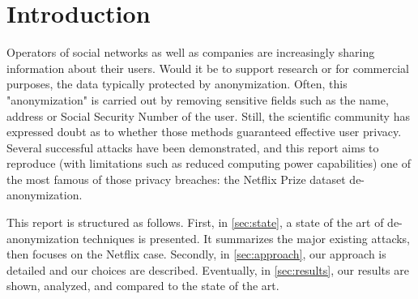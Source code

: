 \section{Introduction}

Operators of social networks as well as companies are increasingly sharing information about their users. Would it be to support research or for commercial purposes, the data typically protected by anonymization. Often, this "anonymization" is carried out by removing sensitive fields such as the name, address or Social Security Number of the user. Still, the scientific community has expressed doubt as to whether those methods guaranteed effective user privacy. Several successful attacks have been demonstrated, and this report aims to reproduce (with limitations such as reduced computing power capabilities) one of the most famous of those privacy breaches: the Netflix Prize dataset de-anonymization.

This report is structured as follows. First, in \autoref{sec:state}, a state of the art of de-anonymization techniques is presented. It summarizes the major existing attacks, then focuses on the Netflix case. Secondly, in \autoref{sec:approach}, our approach is detailed and our choices are described. Eventually, in \autoref{sec:results}, our results are shown, analyzed, and compared to the state of the art. 
